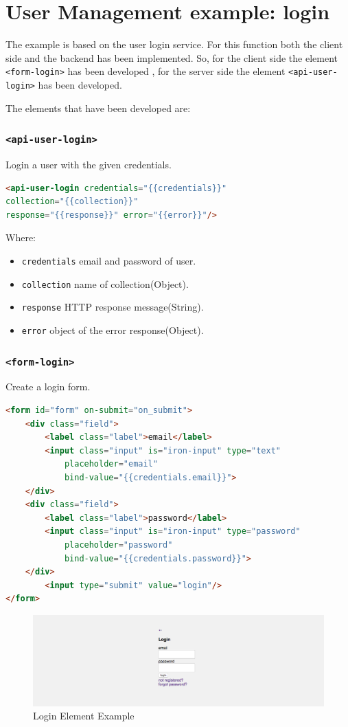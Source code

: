 \section{User Management example: login}
\label{sec:XPR_exmpl}

The example is based on the user login service. 
For this function both the client side and the backend has been implemented. So, for the client side the element \texttt{<form-login>} has been developed , for the server side the element \texttt{<api-user-login>} has been developed.

The elements that have been developed are:

\subsubsection{\texttt{<api-user-login>}}

Login a user with the given credentials.

\begin{lstlisting}[language=html]
<api-user-login credentials="{{credentials}}"
collection="{{collection}}" 
response="{{response}}" error="{{error}}"/>
\end{lstlisting}
Where:
\begin{itemize}
\item \texttt{credentials} email and password of user.
\item \texttt{collection} name of collection(Object).
\item \texttt{response}	HTTP response message(String).
\item \texttt{error} object of the error response(Object).
\end{itemize}

\subsubsection{\texttt{<form-login>}}

Create a login form.

\begin{lstlisting}[language=html]
<form id="form" on-submit="on_submit">
    <div class="field">
        <label class="label">email</label>
        <input class="input" is="iron-input" type="text" 
    		placeholder="email" 
            bind-value="{{credentials.email}}">
    </div>
    <div class="field">
        <label class="label">password</label>
        <input class="input" is="iron-input" type="password" 
        	placeholder="password" 
        	bind-value="{{credentials.password}}">
    </div>
      	<input type="submit" value="login"/>
</form>
\end{lstlisting}


\begin {figure}[h]
\graphicspath{{images/chapter_USR/}}
\includegraphics[width=\textwidth]{usr1}
\caption{Login Element Example}
\end {figure}